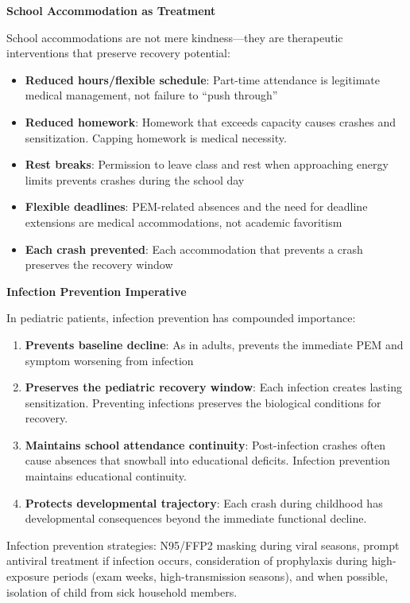 \begin{protocol}
\textbf{School Accommodation as Treatment}

School accommodations are not mere kindness---they are therapeutic interventions that preserve recovery potential:

\begin{itemize}
    \item \textbf{Reduced hours/flexible schedule}: Part-time attendance is legitimate medical management, not failure to ``push through''
    \item \textbf{Reduced homework}: Homework that exceeds capacity causes crashes and sensitization. Capping homework is medical necessity.
    \item \textbf{Rest breaks}: Permission to leave class and rest when approaching energy limits prevents crashes during the school day
    \item \textbf{Flexible deadlines}: PEM-related absences and the need for deadline extensions are medical accommodations, not academic favoritism
    \item \textbf{Each crash prevented}: Each accommodation that prevents a crash preserves the recovery window
\end{itemize}

\textbf{Infection Prevention Imperative}

In pediatric patients, infection prevention has compounded importance:

\begin{enumerate}
    \item \textbf{Prevents baseline decline}: As in adults, prevents the immediate PEM and symptom worsening from infection
    \item \textbf{Preserves the pediatric recovery window}: Each infection creates lasting sensitization. Preventing infections preserves the biological conditions for recovery.
    \item \textbf{Maintains school attendance continuity}: Post-infection crashes often cause absences that snowball into educational deficits. Infection prevention maintains educational continuity.
    \item \textbf{Protects developmental trajectory}: Each crash during childhood has developmental consequences beyond the immediate functional decline.
\end{enumerate}

Infection prevention strategies: N95/FFP2 masking during viral seasons, prompt antiviral treatment if infection occurs, consideration of prophylaxis during high-exposure periods (exam weeks, high-transmission seasons), and when possible, isolation of child from sick household members.

\end{protocol}

